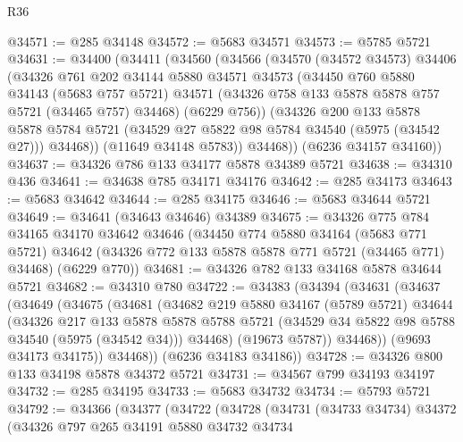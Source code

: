 \begin{lexlean}{R36}
\begin{coremodule}
@34571 := @285 @34148
@34572 := @5683 @34571
@34573 := @5785 @5721
@34631 := @34400
    (@34411
      (@34560
        (@34566
          (@34570
            (@34572 @34573)
            @34406
            (@34326
              @761
              @202
              @34144
              @5880
              @34571
              @34573
              (@34450
                @760
                @5880
                @34143
                (@5683 @757 @5721)
                @34571
                (@34326 @758 @133 @5878 @5878 @757 @5721 (@34465 @757) @34468)
                (@6229 @756))
              (@34326
                @200
                @133
                @5878
                @5878
                @5784
                @5721
                (@34529 @27 @5822 @98 @5784 @34540 (@5975 (@34542 @27)))
                @34468))
            (@11649 @34148 @5783))
          @34468))
      (@6236 @34157 @34160))
@34637 := @34326 @786 @133 @34177 @5878 @34389 @5721
@34638 := @34310 @436
@34641 := @34638 @785 @34171 @34176
@34642 := @285 @34173
@34643 := @5683 @34642
@34644 := @285 @34175
@34646 := @5683 @34644 @5721
@34649 := @34641 (@34643 @34646) @34389
@34675 := @34326
    @775
    @784
    @34165
    @34170
    @34642
    @34646
    (@34450
      @774
      @5880
      @34164
      (@5683 @771 @5721)
      @34642
      (@34326 @772 @133 @5878 @5878 @771 @5721 (@34465 @771) @34468)
      (@6229 @770))
@34681 := @34326 @782 @133 @34168 @5878 @34644 @5721
@34682 := @34310 @780
@34722 := @34383
    (@34394
      (@34631
        (@34637
          (@34649
            (@34675
              (@34681
                (@34682
                  @219
                  @5880
                  @34167
                  (@5789 @5721)
                  @34644
                  (@34326
                    @217
                    @133
                    @5878
                    @5878
                    @5788
                    @5721
                    (@34529 @34 @5822 @98 @5788 @34540 (@5975 (@34542 @34)))
                    @34468)
                  (@19673 @5787))
                @34468))
            (@9693 @34173 @34175))
          @34468))
      (@6236 @34183 @34186))
@34728 := @34326 @800 @133 @34198 @5878 @34372 @5721
@34731 := @34567 @799 @34193 @34197
@34732 := @285 @34195
@34733 := @5683 @34732
@34734 := @5793 @5721
@34792 := @34366
    (@34377
      (@34722
        (@34728
          (@34731
            (@34733 @34734)
            @34372
            (@34326
              @797
              @265
              @34191
              @5880
              @34732
              @34734

\end{coremodule}
\end{lexlean}

